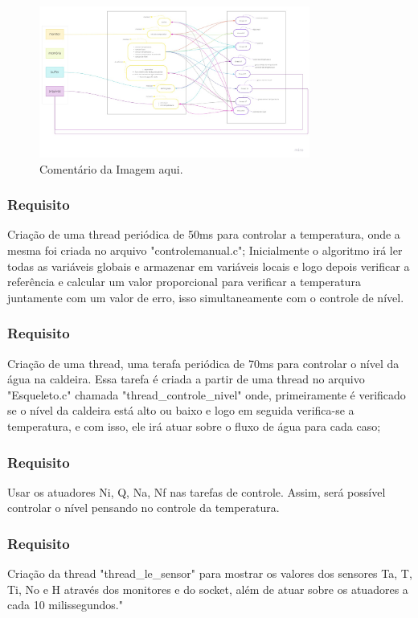 \documentclass[journal]{IEEEtran}
\begin{document}
\begin{figure}[h]
	\centering
	\includegraphics[width=3.5in]{Imagens/esquema.jpg}	
	\caption{Comentário da Imagem aqui.}
	\label{fig1}
\end{figure}

\subsubsection{Requisito}Criação de uma thread periódica de 50ms para controlar a temperatura, onde a mesma foi criada no arquivo "controlemanual.c"; Inicialmente o algoritmo irá ler todas as variáveis globais e armazenar em variáveis locais e logo depois verificar a referência e calcular um valor proporcional para verificar a temperatura juntamente com um valor de erro, isso simultaneamente com o controle de nível.

\subsubsection{Requisito}Criação de uma thread, uma terafa periódica de 70ms para controlar o nível da água na caldeira. Essa tarefa é criada a partir de uma thread no arquivo "Esqueleto.c" chamada "thread\_controle\_nivel" onde, primeiramente é verificado se o nível da caldeira está alto ou baixo e logo em seguida verifica-se a temperatura, e com isso, ele irá atuar sobre o fluxo de água para cada caso;

\subsubsection{Requisito}Usar os atuadores Ni, Q, Na, Nf nas tarefas de controle. Assim, será possível controlar o nível pensando no controle da temperatura.

\subsubsection{Requisito}Criação da thread "thread\_le\_sensor" para mostrar os valores dos sensores Ta, T, Ti, No e H através dos monitores e do socket, além de atuar sobre os atuadores a cada 10 milissegundos."
\end{document}
